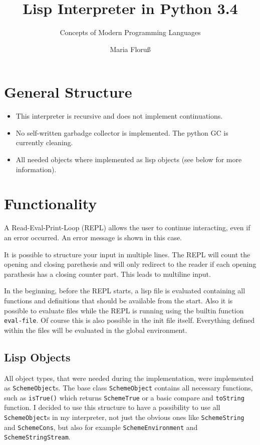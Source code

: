 \documentclass[12pt,a4paper]{scrartcl}
\begin{document}
\title{Lisp Interpreter in Python 3.4}
\subtitle{Concepts of Modern Programming Languages}
\author{Maria Floru\ss}
\maketitle
\newpage

\tableofcontents

\section{General Structure}
\begin{itemize}
\item This interpreter is recursive and does not implement continuations. 
\item No self-written garbadge collector is implemented. The python GC is currently cleaning.
\item All needed objects where implemented as lisp objects (see below for more information).
\end{itemize}

\section{Functionality}
A Read-Eval-Print-Loop (REPL) allows the user to continue interacting, even if an error occurred. An error message is shown in this case.

It is possible to structure your input in multiple lines. The REPL will count the opening and closing parethesis and will only redirect to the reader if each opening parathesis has a closing counter part. This leads to multiline input.

In the beginning, before the REPL starts, a lisp file is evaluated containing all functions and definitions that should be available from the start. Also it is possible to evaluate files while the REPL is running using the builtin function \lstinline{eval-file}. Of course this is also possible in the init file itself. Everything defined within the files will be evaluated in the global environment.

\subsection{Lisp Objects}
All object types, that were needed during the implementation, were implemented as \lstinline{SchemeObject}s. The base class \lstinline{SchemeObject} contains all necessary functions, such as \lstinline{isTrue()} which returns \lstinline{SchemeTrue} or a basic compare and \lstinline{toString} function. I decided to use this structure to have a possibility to use all \lstinline{SchemeObject}s in my interpreter, not just the obvious ones like \lstinline{SchemeString} and \lstinline{SchemeCons}, but also for example \lstinline{SchemeEnvironment} and \lstinline{SchemeStringStream}. 
\end{document}

